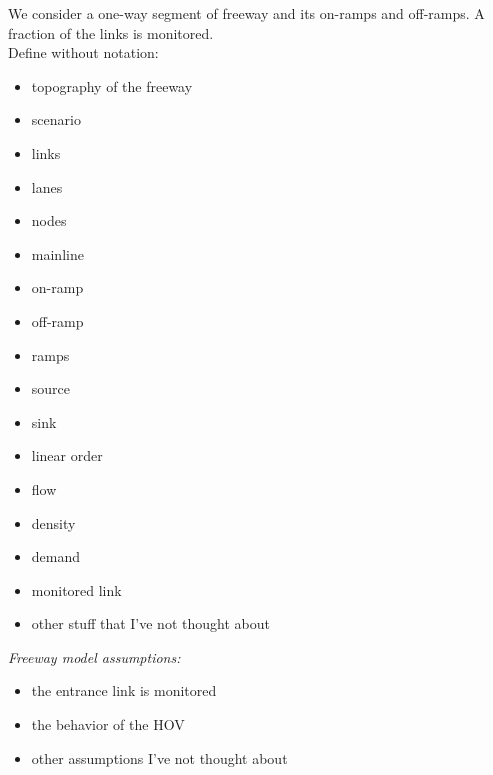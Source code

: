 We consider a one-way segment of freeway and its on-ramps and off-ramps.
A fraction of the links is monitored.\\
Define without notation:
\begin{itemize}
	\item topography of the freeway
	\item scenario
	\item links
	\item lanes
	\item nodes
	\item mainline
	\item on-ramp
	\item off-ramp
	\item ramps
	\item source
	\item sink
	\item linear order
	\item flow
	\item density
	\item demand
	\item monitored link
	\item other stuff that I've not thought about
\end{itemize}
\emph{Freeway model assumptions:}
\begin{itemize}
	\item the entrance link is monitored
	\item the behavior of the HOV
	\item other assumptions I've not thought about
\end{itemize}

